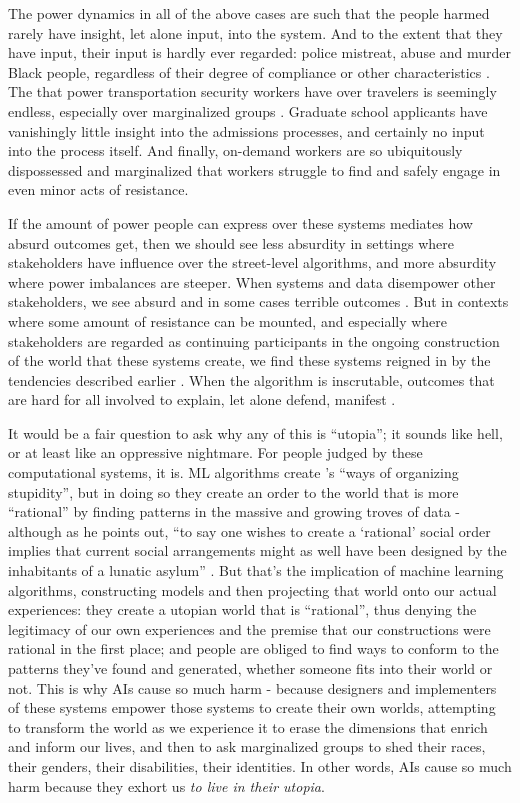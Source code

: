 \documentclass[manuscript,screen]{acmart}
\begin{document}
The power dynamics in all of the above cases are such that the people harmed rarely have insight, let alone input, into the system.
And to the extent that they have input, their input is hardly ever regarded: police mistreat, abuse and murder Black people, regardless of their degree of compliance or other characteristics
\cite{moore2018critical}.
The that power transportation security workers have over travelers is seemingly endless, especially over marginalized groups
\cite{chapablanco2018traveling}.
Graduate school applicants have vanishingly little insight into the admissions processes, and certainly no input into the process itself.
And finally, on-demand workers are so ubiquitously dispossessed and marginalized that workers struggle to find and safely engage in even minor acts of resistance.

If the amount of power people can express over these systems mediates how absurd outcomes get, then we should see less absurdity in settings where stakeholders have influence over the street-level algorithms, and more absurdity where power imbalances are steeper.
When systems and data disempower other stakeholders, we see absurd and in some cases terrible outcomes
\cite{Bopp:2017:DDN:3025453.3025694}.
But in contexts where some amount of resistance can be mounted, and especially where stakeholders are regarded as continuing participants in the ongoing construction of the world that these systems create, we find these systems reigned in by the tendencies described earlier
\cite{doi:10.1177/2053951717718855}.
When the algorithm is inscrutable, outcomes that are hard for all involved to explain, let alone defend, manifest
\cite{streetLevelAlgorithms,LGBTYouTube,ibrahim2010breastfeeding,adpocalypseForbes}.

It would be a fair question to ask why any of this is ``utopia'';
it sounds like hell, or at least like an oppressive nightmare.
For people judged by these computational systems, it is.
ML algorithms create \citeauthor{graeber2015utopia}'s ``ways of organizing stupidity'', but in doing so they create an order to the world that is more ``rational'' by finding patterns in the massive and growing troves of data - although as he points out, ``to say one wishes to create a `rational' social order implies that current social arrangements might as well have been designed by the inhabitants of a lunatic asylum''
\cite{graeber2015utopia}.
But that's the implication of machine learning algorithms, constructing models and then projecting that world onto our actual experiences: they create a utopian world that is ``rational'', thus denying the legitimacy of our own experiences and the premise that our constructions were rational in the first place;
and people are obliged to find ways to conform to the patterns they've found and generated, whether someone fits into their world or not.
This is why AIs cause so much harm - because designers and implementers of these systems empower those systems to create their own worlds, attempting to transform the world as we experience it to erase the dimensions that enrich and inform our lives, and then to ask marginalized groups to shed their races, their genders, their disabilities, their identities.
In other words, AIs cause so much harm because they exhort us \emph{to live in their utopia}.
\end{document}

